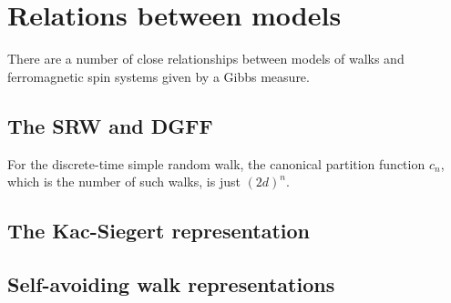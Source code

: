 \section{Relations between models}

There are a number of close relationships between models of walks and ferromagnetic spin
systems given by a Gibbs measure.


\subsection{The SRW and DGFF}


For the discrete-time simple random walk, the canonical partition function $c_n$,
which is the number of such walks, is just $(2 d)^n$.


\subsection{The Kac-Siegert representation}



\subsection{Self-avoiding walk representations}

